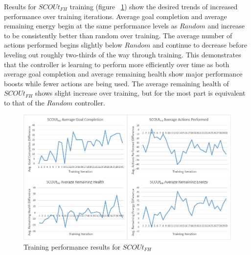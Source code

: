 
Results for $SCOUt_{FH}$ training (figure ~\ref{fig:findhuman_training_results}) show the desired trends of increased performance over training iterations.
Average goal completion and average remaining energy begin at the same performance levels as $Random$ and increase to be consistently better than random over training.
The average number of actions performed begins slightly below $Random$ and continue to decrease before leveling out roughly two-thirds of the way through training.
This demonstrates that the controller is learning to perform more efficiently over time as both average goal completion and average remaining health show major performance boosts while fewer actions are being used.
The average remaining health of $SCOUt_{FH}$ shows slight increase over training, but for the most part is equivalent to that of the $Random$ controller.

\begin{figure}[h]
  \includegraphics[width=1.0\columnwidth]{Figures/Results/Training/SCOUt-FindHuman.JPG}
  \caption{Training performance results for $SCOUt_{FH}$}
  \label{fig:findhuman_training_results}
\end{figure}

